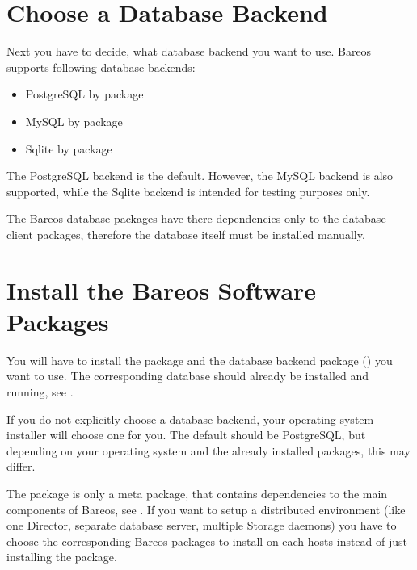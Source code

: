 \section{Choose a Database Backend}
    \label{sec:ChooseDatabaseBackend}

Next you have to decide, what database backend you want to use.
Bareos supports following database backends:
\begin{itemize}
    \item PostgreSQL by package 
    \item MySQL by package 
    \item Sqlite by package  \\
\end{itemize}

The PostgreSQL backend is the default.
However, the MySQL backend is also supported,
while the Sqlite backend is intended for testing purposes only.

The Bareos database packages have there dependencies only to the database client packages, 
therefore the database itself must be installed manually.


\section{Install the Bareos Software Packages}
    \label{sec:InstallBareosPackages}

You will have to install the package  
and the database backend package () you want to use.
The corresponding database should already be installed and running, see .

If you do not explicitly choose a database backend, your operating system installer will choose one for you.
The default should be PostgreSQL, but depending on your operating system and the already installed packages, 
this may differ.

The package  is only a meta package, that contains dependencies to the main components of Bareos, see . 
If you want to setup a distributed environment (like one Director, separate database server, multiple Storage daemons)
you have to choose the corresponding Bareos packages to install on each hosts instead of just installing the  package.

